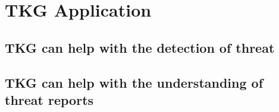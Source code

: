 \section{TKG Application}
\label{sec:applicaiton}

\subsection{TKG can help with the detection of threat}

\subsection{TKG can help with the understanding of threat reports}
